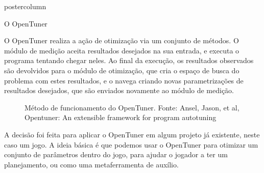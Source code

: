 \documentclass[final]{beamer}
\begin{document}
\begin{frame}
\begin{columns}
\begin{column}{.5\textwidth}
\begin{beamercolorbox}[center,wd=\textwidth]{postercolumn}
\begin{minipage}[T]{.95\textwidth}
{\begin{block}{O OpenTuner}
                \vspace*{0.2cm}
                
                O OpenTuner realiza a ação de otimização via um conjunto de métodos. O módulo de medição aceita resultados desejados na sua entrada, e executa o programa tentando chegar neles. Ao final da execução, os resultados observados são devolvidos para o módulo de otimização, que cria o espaço de busca do problema com estes resultados, e o navega criando novas parametrizações de resultados desejados, que são enviados novamente ao módulo de medição.
                
                \vspace*{0.4cm} 
                
                
                \begin{figure}[h]
                  \caption{Método de funcionamento do OpenTuner.
                    Fonte: Ansel, Jason, et al, Opentuner: An extensible framework for program autotuning}
                \end{figure}
                
                \vspace*{0.2cm} 
                
                A decisão foi feita para aplicar o OpenTuner em algum projeto já existente, neste caso um jogo. A ideia básica é que podemos usar o OpenTuner para otimizar um conjunto de parâmetros dentro do jogo, para ajudar o jogador a ter um planejamento, ou como uma metaferramenta de auxílio.
                               
                \vspace*{0.2cm} 
            \end{block}
                        
            \vspace*{0.2cm}
          }
        \end{minipage}
      \end{beamercolorbox}
    \end{column}


\end{columns}
\end{frame}
\end{document}
